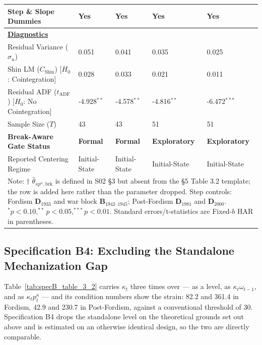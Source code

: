 \documentclass[11pt,a4paper]{article}
\begin{document}
\begin{table}[H]
\begin{tabular}{p{5.5cm}p{2.5cm}p{2.5cm}p{2.5cm}p{2.5cm}}
Step \& Slope Dummies & Yes & Yes & Yes & Yes \\
\midrule
\multicolumn{5}{l}{\underline{\textbf{Diagnostics}}} \\
Residual Variance ($\hat{\sigma}_u$) & 0.051 & 0.041 & 0.035 & 0.025 \\
Shin LM ($C_{\text{Shin}}$) [$H_0$: Cointegration] & 0.028 & 0.033 & 0.021 & 0.011 \\
Residual ADF ($t_{\text{ADF}}$) [$H_0$: No Cointegration] & -4.928$^{**}$ & -4.578$^{**}$ & -4.816$^{**}$ & -6.472$^{***}$ \\
Sample Size ($T$) & 43 & 43 & 51 & 51 \\
\textbf{Break-Aware Gate Status} & \textbf{Formal} & \textbf{Formal} & \textbf{Exploratory} & \textbf{Exploratory} \\
Reported Centering Regime & Initial-State & Initial-State & Initial-State & Initial-State \\
\bottomrule
\multicolumn{5}{p{15.5cm}}{\footnotesize Note: $\dagger$ $\hat{\theta}_{\kappa p^{\kappa}, \text{brk}}$ is defined in S02 \S3 but absent from the \S5 Table 3.2 template; the row is added here rather than the parameter dropped. Step controls: Fordism $\mathbf{D}_{1933}$ and war block $\mathbf{B}_{1942\text{--}1945}$; Post-Fordism $\mathbf{D}_{1981}$ and $\mathbf{D}_{2000}$. $^{*}p<0.10, ^{**}p<0.05, ^{***}p<0.01$. Standard errors/t-statistics are Fixed-$b$ HAR in parentheses.}
\end{tabular}
\end{table}

\FloatBarrier
\subsection{Specification B4: Excluding the Standalone Mechanization Gap}
\label{sec:specB4}

Table~\ref{tab:specB_table_3_2} carries $\kappa_t$ three times over --- as a level, as $\kappa_t \omega_{t-1}$, and as $\kappa_t p_t^{\kappa}$ --- and its condition numbers show the strain: 82.2 and 361.4 in Fordism, 42.9 and 230.7 in Post-Fordism, against a conventional threshold of 30. Specification B4 drops the standalone level on the theoretical grounds set out above and is estimated on an otherwise identical design, so the two are directly comparable.
\end{document}
